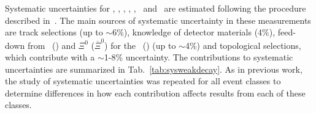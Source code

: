 Systematic uncertainties for \kzero, \lmb, \almb, \X, \Ix, \Om\ and \Mo\ are estimated following the 
procedure described in~\cite{Abelev:2013haa,  Adam:2015vsf}. The main sources of systematic 
uncertainty in these measurements are track selections (up to $\sim$6\%), knowledge of detector 
materials (4\%), feed-down from \X\ (\Ix) and $\Xi^{0}$ ($\overline{\Xi}^{0}$) for the \lmb\ (\almb) (up to $\sim$4\%) 
and topological selections, which contribute with a $\sim$1-8\% uncertainty. 
The contributions to 
systematic uncertainties are summarized in Tab.~\ref{tab:sysweakdecay}. As in previous work, 
the study of systematic uncertainties was repeated for all event classes to determine
differences in how each contribution affects results from each of these classes. 




